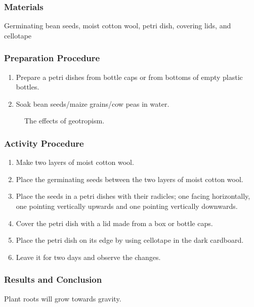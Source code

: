 \subsubsection*{Materials}
Germinating bean seeds, moist cotton wool, petri dish, covering lids, and cellotape

\subsubsection*{Preparation Procedure}
\begin{enumerate}
\item{Prepare a petri dishes from bottle caps or from bottoms of empty plastic bottles.}
\item{Soak bean seeds/maize grains/cow peas in water.}
\end{enumerate}

\begin{figure}[h]
\begin{center}
\def\svgwidth{8.5cm}

\caption{The effects of geotropism.}
\label{fig:fish}
\end{center}
\end{figure}

\subsubsection*{Activity Procedure}
\begin{enumerate}
\item{Make two layers of moist cotton wool.}
\item{Place the germinating seeds between the two layers of moist cotton wool.}
\item{Place the seeds in a petri dishes with their radicles; one facing horizontally, one pointing vertically upwards and one pointing vertically downwards.}
\item{Cover the petri dish with a lid made from a box or bottle caps.}
\item{Place the petri dish on its edge by using cellotape in the dark cardboard.}
\item{Leave it for two days and observe the changes.}
\end{enumerate}

\subsubsection*{Results and Conclusion}
Plant roots will grow towards gravity.


